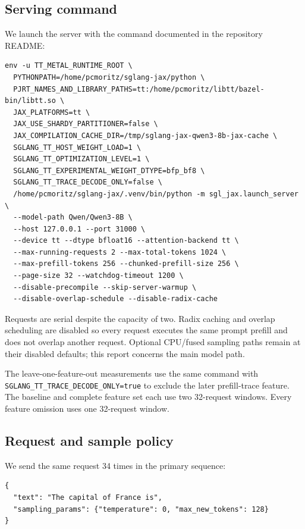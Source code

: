 \documentclass[
  10pt,
  american,
  10pt,
  letterpaper]{article}
\begin{document}
\hypertarget{serving-command}{%
\subsection{Serving command}\label{serving-command}}

We launch the server with the command documented in the repository
README:

\begin{verbatim}
env -u TT_METAL_RUNTIME_ROOT \
  PYTHONPATH=/home/pcmoritz/sglang-jax/python \
  PJRT_NAMES_AND_LIBRARY_PATHS=tt:/home/pcmoritz/libtt/bazel-bin/libtt.so \
  JAX_PLATFORMS=tt \
  JAX_USE_SHARDY_PARTITIONER=false \
  JAX_COMPILATION_CACHE_DIR=/tmp/sglang-jax-qwen3-8b-jax-cache \
  SGLANG_TT_HOST_WEIGHT_LOAD=1 \
  SGLANG_TT_OPTIMIZATION_LEVEL=1 \
  SGLANG_TT_EXPERIMENTAL_WEIGHT_DTYPE=bfp_bf8 \
  SGLANG_TT_TRACE_DECODE_ONLY=false \
  /home/pcmoritz/sglang-jax/.venv/bin/python -m sgl_jax.launch_server \
  --model-path Qwen/Qwen3-8B \
  --host 127.0.0.1 --port 31000 \
  --device tt --dtype bfloat16 --attention-backend tt \
  --max-running-requests 2 --max-total-tokens 1024 \
  --max-prefill-tokens 256 --chunked-prefill-size 256 \
  --page-size 32 --watchdog-timeout 1200 \
  --disable-precompile --skip-server-warmup \
  --disable-overlap-schedule --disable-radix-cache
\end{verbatim}

Requests are serial despite the capacity of two. Radix caching and
overlap scheduling are disabled so every request executes the same
prompt prefill and does not overlap another request. Optional CPU/fused
sampling paths remain at their disabled defaults; this report concerns
the main model path.

The leave-one-feature-out measurements use the same command with
\texttt{SGLANG\_TT\_TRACE\_DECODE\_ONLY=true} to exclude the later
prefill-trace feature. The baseline and complete feature set each use
two 32-request windows. Every feature omission uses one 32-request
window.

\hypertarget{request-and-sample-policy}{%
\subsection{Request and sample policy}\label{request-and-sample-policy}}

We send the same request 34 times in the primary sequence:

\begin{verbatim}
{
  "text": "The capital of France is",
  "sampling_params": {"temperature": 0, "max_new_tokens": 128}
}
\end{verbatim}
\end{document}
